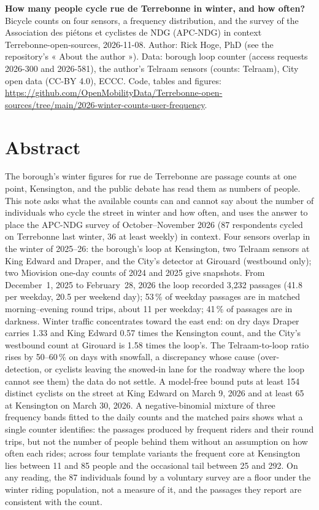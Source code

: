 \documentclass[11pt,a4paper]{article}
\begin{document}
{\LARGE\textbf{How many people cycle rue de Terrebonne in winter, and how often?}}\\[3pt]
{\large Bicycle counts on four sensors, a frequency distribution, and the survey of the Association des piétons et cyclistes de NDG (APC-NDG) in context}\\[4pt]
{\small Terrebonne-open-sources, 2026-11-08. Author: Rick Hoge, PhD (see the repository\textquoteright{}s « About the author »). Data: borough loop counter (access requests 2026-300 and 2026-581), the author\textquoteright{}s Telraam sensors (counts: Telraam), City open data (CC-BY 4.0), ECCC. Code, tables and figures: \url{https://github.com/OpenMobilityData/Terrebonne-open-sources/tree/main/2026-winter-counts-user-frequency}.}

\section*{Abstract}
The borough\textquoteright{}s winter figures for rue de Terrebonne are passage counts at one point, Kensington, and the public debate has read them as numbers of people. This note asks what the available counts can and cannot say about the number of individuals who cycle the street in winter and how often, and uses the answer to place the APC-NDG survey of October--November 2026 (87 respondents cycled on Terrebonne last winter, 36 at least weekly) in context. Four sensors overlap in the winter of 2025--26: the borough\textquoteright{}s loop at Kensington, two Telraam sensors at King Edward and Draper, and the City\textquoteright{}s detector at Girouard (westbound only); two Miovision one-day counts of 2024 and 2025 give snapshots. From December~1, 2025 to February~28, 2026 the loop recorded 3,232 passages (41.8 per weekday, 20.5 per weekend day); 53\,\% of weekday passages are in matched morning--evening round trips, about 11 per weekday; 41\,\% of passages are in darkness. Winter traffic concentrates toward the east end: on dry days Draper carries 1.33 and King Edward 0.57 times the Kensington count, and the City\textquoteright{}s westbound count at Girouard is 1.58 times the loop\textquoteright{}s. The Telraam-to-loop ratio rises by 50--60\,\% on days with snowfall, a discrepancy whose cause (over-detection, or cyclists leaving the snowed-in lane for the roadway where the loop cannot see them) the data do not settle. A model-free bound puts at least 154 distinct cyclists on the street at King Edward on March 9, 2026 and at least 65 at Kensington on March 30, 2026. A negative-binomial mixture of three frequency bands fitted to the daily counts and the matched pairs shows what a single counter identifies: the passages produced by frequent riders and their round trips, but not the number of people behind them without an assumption on how often each rides; across four template variants the frequent core at Kensington lies between 11 and 85 people and the occasional tail between 25 and 292. On any reading, the 87 individuals found by a voluntary survey are a floor under the winter riding population, not a measure of it, and the passages they report are consistent with the count.
\end{document}
